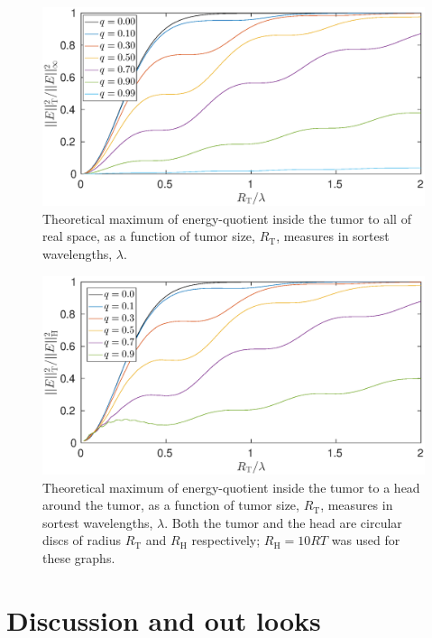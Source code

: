 \documentclass[11pt,a4paper, 
swedish,english %
]{article}
\newcommand{\RT}{\ensuremath{R_{\text{T}}}}
\newcommand{\RH}{\ensuremath{R_{\text{H}}}}
\begin{document}
\begin{figure}\centering
\centerline{ %
\includegraphics[width=18cm]{ring_T-infty_L1000.eps}
}
\caption{Theoretical maximum of energy-quotient inside the tumor
  to all of real space, as a function of tumor size, $\RT$, measures
  in sortest wavelengths, $\lambda$.}
\label{fig:T-infty}
\end{figure}

\begin{figure}\centering
\centerline{ %
\includegraphics[width=18cm]{ring_T-H_L1000.eps}
}
\caption{Theoretical maximum of energy-quotient inside the tumor
  to a head around the tumor, as a function of tumor size, $\RT$,
  measures in sortest wavelengths, $\lambda$. Both the tumor and the
  head are circular discs of radius $\RT$ and $\RH$ respectively;
  $\RH=10RT$ was used for these graphs.}
\label{fig:T-H}
\end{figure}

\section{Discussion and out looks}
\label{ch:discussion}
\end{document}
